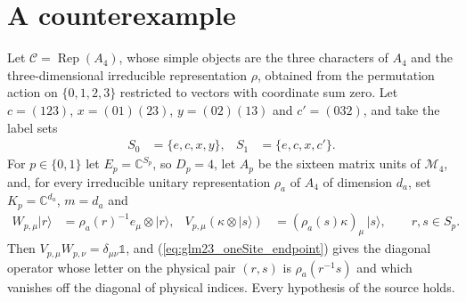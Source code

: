 \documentclass{article}
\begin{document}
\section{A counterexample}
Let $\mathcal C=\operatorname{Rep}(A_4)$, whose simple objects are the three
characters of $A_4$ and the three-dimensional irreducible representation
$\rho$, obtained from the permutation action on $\{0,1,2,3\}$ restricted to
vectors with coordinate sum zero. Let $c=(123)$, $x=(01)(23)$, $y=(02)(13)$
and $c'=(032)$, and take the label sets
\begin{align}
    S_0 & =\{e,c,x,y\}, & S_1 & =\{e,c,x,c'\}.
    \label{eq:glm23_oneSite_labels}
\end{align}
For $p\in\{0,1\}$ let $E_p=\mathbb C^{S_p}$, so $D_p=4$, let $A_p$ be the
sixteen matrix units of $\mathcal M_4$, and, for every irreducible unitary
representation $\rho_a$ of $A_4$ of dimension $d_a$, set
$K_p=\mathbb C^{d_a}$, $m=d_a$ and
\begin{align}
    W_{p,\mu}|r\rangle & =\rho_a(r)^{-1}e_\mu\otimes|r\rangle,
                       &
    V_{p,\mu}(\kappa\otimes|s\rangle)
                       & =(\rho_a(s)\kappa)_\mu\,|s\rangle,
    \qquad r,s\in S_p.
    \label{eq:glm23_oneSite_action}
\end{align}
Then $V_{p,\mu}W_{p,\nu}=\delta_{\mu\nu}\mathbb 1$, and
(\ref{eq:glm23_oneSite_endpoint}) gives the diagonal operator whose letter on
the physical pair $(r,s)$ is $\rho_a(r^{-1}s)$ and which vanishes off the
diagonal of physical indices. Every hypothesis of the source holds.
\end{document}
